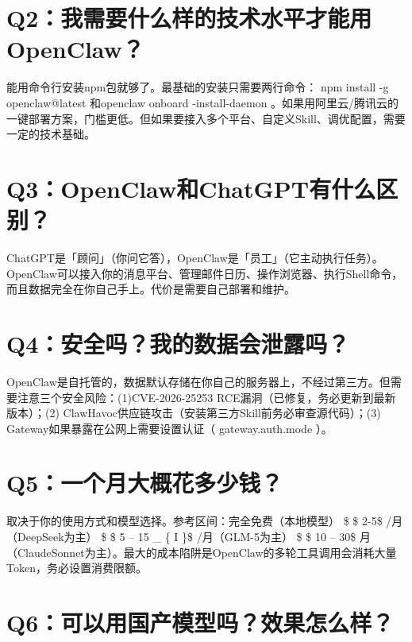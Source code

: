 \documentclass[
  10
]{article}
\begin{document}
\section{Q2：我需要什么样的技术水平才能用OpenClaw？}\label{q2ux6211ux9700ux8981ux4ec0ux4e48ux6837ux7684ux6280ux672fux6c34ux5e73ux624dux80fdux7528openclaw}

能用命令行安装npm包就够了。最基础的安装只需要两行命令： npm install -g
openclaw@latest 和openclaw onboard -install-daemon
。如果用阿里云/腾讯云的一键部署方案，门槛更低。但如果要接入多个平台、自定义Skill、调优配置，需要一定的技术基础。

\section{Q3：OpenClaw和ChatGPT有什么区别？}\label{q3openclawux548cchatgptux6709ux4ec0ux4e48ux533aux522b}

ChatGPT是「顾问」（你问它答），OpenClaw是「员工」（它主动执行任务）。OpenClaw可以接入你的消息平台、管理邮件日历、操作浏览器、执行Shell命令，而且数据完全在你自己手上。代价是需要自己部署和维护。

\section{Q4：安全吗？我的数据会泄露吗？}\label{q4ux5b89ux5168ux5417ux6211ux7684ux6570ux636eux4f1aux6cc4ux9732ux5417}

OpenClaw是自托管的，数据默认存储在你自己的服务器上，不经过第三方。但需要注意三个安全风险：(1)CVE-2026-25253
RCE漏洞（已修复，务必更新到最新版本）；(2)
ClawHavoc供应链攻击（安装第三方Skill前务必审查源代码）；(3)
Gateway如果暴露在公网上需要设置认证（ gateway.auth.mode ）。

\section{Q5：一个月大概花多少钱？}\label{q5ux4e00ux4e2aux6708ux5927ux6982ux82b1ux591aux5c11ux94b1}

取决于你的使用方式和模型选择。参考区间：完全免费（本地模型） \$ \$ 2-5\$
/月（DeepSeek为主） \$ \$ 5 -- 15 \_ \{ I \}\$ /月（GLM-5为主） \$ \$ 10
-- 30\$
月（ClaudeSonnet为主）。最大的成本陷阱是OpenClaw的多轮工具调用会消耗大量Token，务必设置消费限额。

\section{Q6：可以用国产模型吗？效果怎么样？}\label{q6ux53efux4ee5ux7528ux56fdux4ea7ux6a21ux578bux5417ux6548ux679cux600eux4e48ux6837}
\end{document}

